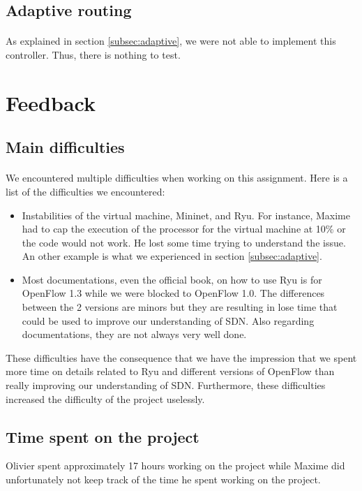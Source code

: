 \documentclass[a4paper, 11pt, oneside]{article}
\begin{document}
\subsection{Adaptive routing}
\paragraph{}As explained in section \ref{subsec:adaptive}, we were not able to implement this controller. Thus, there is nothing to test.


\section{Feedback} \label{sec:feedback}
\subsection{Main difficulties}
\paragraph{}We encountered multiple difficulties when working on this assignment. Here is a list of the difficulties we encountered:
\begin{itemize}
\item Instabilities of the virtual machine, Mininet, and Ryu. For instance, Maxime had to cap the execution of the processor for the virtual machine at 10\% or the code would not work. He lost some time trying to understand the issue. An other example is what we experienced in section \ref{subsec:adaptive}.
\item Most documentations, even the official book, on how to use Ryu is for OpenFlow 1.3 while we were blocked to OpenFlow 1.0. The differences between the 2 versions are minors but they are resulting in lose time that could be used to improve our understanding of SDN. Also regarding documentations, they are not always very well done.
\end{itemize}
These difficulties have the consequence that we have the impression that we spent more time on details related to Ryu and different versions of OpenFlow than really improving our understanding of SDN. Furthermore, these difficulties increased the difficulty of the project uselessly.

\subsection{Time spent on the project}
Olivier spent approximately 17 hours working on the project while Maxime did unfortunately not keep track of the time he spent working on the project.
\end{document}
